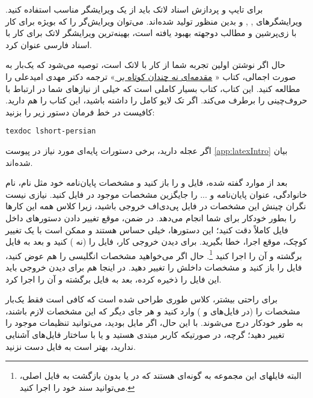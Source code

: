 برای تایپ و پردازش اسناد لاتک باید از یک ویرایشگر مناسب استفاده کنید. ویرایشگرهای
,
,
و
بدین منظور تولید شده‌اند. می‌توان ویرایش‌گر 
 \href{https://bitbucket.org/srazi/biditexmaker3}{}%
را که بویژه برای کار با زی‌پرشین و مطالب دوجهته بهبود یافته است، بهینه‌ترین ویرایشگر لاتک برای کار با اسناد فارسی عنوان کرد.
 
حال اگر نوشتن \پ اولین تجربه شما از کار با لاتک است، توصیه می‌شود که یک‌بار به صورت اجمالی، کتاب «%
\href{http://www.tug.ctan.org/tex-archive/info/lshort/persian/lshort.pdf}{مقدمه‌ای نه چندان کوتاه بر
\lr{\LaTeXe}}%
»
ترجمه دکتر مهدی امیدعلی را مطالعه کنید. این کتاب، کتاب بسیار کاملی است که خیلی از نیازهای شما در ارتباط با حروف‌چینی را برطرف می‌کند.
اگر تک لایو کامل را داشته باشید، این کتاب را هم دارید. کافیست در خط فرمان دستور زیر را بزنید:
\begin{latin}
	\texttt{texdoc lshort-persian}
\end{latin}
اگر عجله دارید، برخی دستورات پایه‌ای مورد نیاز در پیوست \ref{app:latexIntro} بیان شده‌اند.
 
بعد از موارد گفته شده، فایل 
و
را باز کنید و مشخصات پایان‌نامه خود مثل نام، نام خانوادگی، عنوان پایان‌نامه و ... را جایگزین مشخصات موجود در فایل
 کنید. نیازی نیست نگران چینش این مشخصات در فایل پی‌دی‌اف خروجی باشید، زیرا کلاس 
همه این کارها را بطور خودکار برای شما انجام می‌دهد. در ضمن، موقع تغییر دادن دستورهای داخل فایل
 کاملاً دقت کنید؛ این دستورها، خیلی حساس هستند و ممکن است با یک تغییر کوچک، موقع اجرا، خطا بگیرید. برای دیدن خروجی کار، فایل 
 را 
(نه 
)
کنید و بعد به فایل 
برگشته و آن را اجرا کنید%
\footnote{
	البته فایلهای این مجموعه به گونه‌ای هستند که در
	 یا
	بدون بازگشت به فایل اصلی، می‌توانید سند خود را اجرا کنید.
}.
 حال اگر می‌خواهید مشخصات انگلیسی \پ را هم عوض کنید، فایل 
را باز کنید و مشخصات داخلش را تغییر دهید.
در اینجا هم برای دیدن خروجی باید این فایل را ذخیره کرده، بعد به فایل 
برگشته و آن را اجرا کرد.

برای راحتی بیشتر، کلاس 
طوری طراحی شده است که کافی است فقط  یک‌بار مشخصات \پ را (در فایل‌های
و
)
وارد کنید و هر جای دیگر که این مشخصات لازم باشند، به طور خودکار درج می‌شوند. با این حال، اگر مایل بودید، می‌توانید تنظیمات موجود را تغییر دهید؛ گرچه، در صورتیکه کاربر مبتدی هستید و یا با ساختار فایل‌های  
 آشنایی ندارید، بهتر است به فایل 
دست نزنید.


